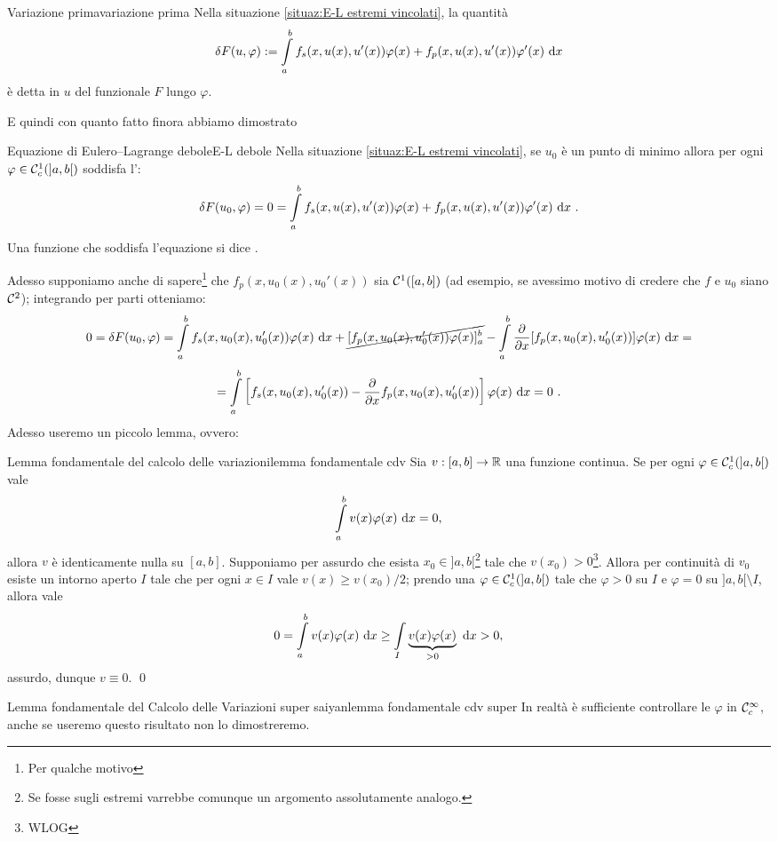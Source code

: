 \documentclass[openany]{book}
\begin{document}
\begin{definition}{Variazione prima}{variazione prima}
    Nella situazione \ref{situaz:E-L estremi vincolati}, la quantità
    \[\delta F(u, \varphi) := \intop_a^b f_s(x,u(x),u'(x))\varphi(x) + f_p(x,u(x),u'(x))\varphi'(x)\de x \]
    è detta  in $u$ del funzionale $F$ lungo $\varphi$.
\end{definition}

E quindi con quanto fatto finora abbiamo dimostrato 

\begin{proposition}{Equazione di Eulero--Lagrange debole}{E-L debole}
    Nella situazione \ref{situaz:E-L estremi vincolati}, se $u_0$ è un punto di minimo allora per ogni $\varphi \in \mathcal{C}_c^1(]a,b[)$ soddisfa l':
    \[\delta F(u_0,\varphi) = 0 = \intop_a^b f_s(x,u(x),u'(x))\varphi(x) + f_p(x,u(x),u'(x))\varphi'(x)\de x\ .\]
    Una funzione che soddisfa l'equazione si dice .
\end{proposition}

Adesso supponiamo anche di sapere\footnote{Per qualche motivo} che $f_p(x, u_0(x), u_0'(x))$ sia $\mathcal{C}^1([a,b])$ (ad esempio, se avessimo motivo di credere che $f$ e $u_0$ siano $\mathcal{C}^2$); integrando per parti otteniamo:
\[ 0 = \delta F(u_0,\varphi) = \intop_a^b f_s(x,u_0(x),u_0'(x))\varphi(x)\de x + \cancel{[f_p(x,u_0(x),u_0'(x))\varphi(x)]_a^b} - \intop_a^b \frac{\partial}{\partial x} [f_p(x, u_0(x), u_0'(x))]\varphi(x)\de x = \]
\[ = \intop_a^b \left[ f_s(x,u_0(x),u_0'(x)) - \frac{\partial}{\partial x} f_p(x, u_0(x), u_0'(x)) \right]\varphi(x)\de x = 0\ . \]
Adesso useremo un piccolo lemma, ovvero:

\begin{lemma}{Lemma fondamentale del calcolo delle variazioni}{lemma fondamentale cdv}
    Sia $v : [a,b]\to\mathbb{R}$ una funzione continua. Se per ogni $\varphi \in \mathcal{C}_c^1(]a,b[)$ vale
    \[\intop_a^b v(x)\varphi(x)\de x = 0,\]
    allora $v$ è identicamente nulla su $[a,b]$.
    \proof 
    Supponiamo per assurdo che esista $x_0 \in ]a,b[$\footnote{Se fosse sugli estremi varrebbe comunque un argomento assolutamente analogo.} tale che $v(x_0)>0$\footnote{WLOG}. Allora per continuità di $v_0$ esiste un intorno aperto $I$ tale che per ogni $x \in I$ vale $v(x) \ge v(x_0)/2$; prendo una $\varphi \in \mathcal{C}^1_c(]a,b[)$ tale che $\varphi > 0$ su $I$ e $\varphi = 0$ su $]a,b[\setminus I$, allora vale
    \[ 0 = \intop_a^b v(x) \varphi(x) \de x \ge \intop_I \underbrace{v(x)\varphi(x)}_{>0} \de x > 0, \]
    assurdo, dunque $v \equiv 0$.
    \qed
\end{lemma}
\begin{remark}{Lemma fondamentale del Calcolo delle Variazioni super saiyan}{lemma fondamentale cdv super}
    In realtà è sufficiente controllare le $\varphi$ in $\mathcal{C}_c^\infty$, anche se useremo questo risultato non lo dimostreremo.
\end{remark}
\end{document}
